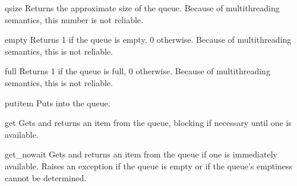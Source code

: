 
\begin{funcdesc}{qsize}{}
Returns the approximate size of the queue.  Because of multithreading
semantics, this number is not reliable.
\end{funcdesc}


\begin{funcdesc}{empty}{}
Returns 1 if the queue is empty, 0 otherwise.  Because of
multithreading semantics, this is not reliable.
\end{funcdesc}


\begin{funcdesc}{full}{}
Returns 1 if the queue is full, 0 otherwise.  Because of
multithreading semantics, this is not reliable.
\end{funcdesc}


\begin{funcdesc}{put}{item}
Puts  into the queue.
\end{funcdesc}


\begin{funcdesc}{get}{}
Gets and returns an item from the queue, blocking if necessary until
one is available.
\end{funcdesc}


\begin{funcdesc}{get_nowait}{}
Gets and returns an item from the queue if one is immediately
available.  Raises an  exception if the queue is empty or
if the queue's emptiness cannot be determined.
\end{funcdesc}
